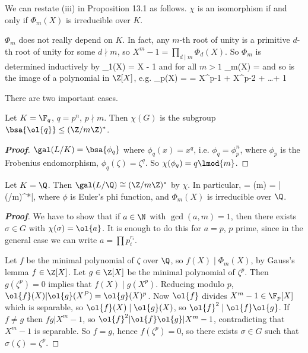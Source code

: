 We can restate (iii) in Proposition 13.1 as follows. $\chi$ is an isomorphism if and only if $\Phi_m(X)$ is irreducible over $K$.

$\Phi_m$ does not really depend on $K$. In fact, any $m$-th root of unity is a primitive $d$-th root of unity for some $d \nmid m$, so $X^m - 1 = \prod_{d\mid m} \Phi_d(X)$. So $\Phi_m$ is determined inductively by
\be
\Phi_1(X) = X - 1
\ee
and for all $m > 1$
\be
\Phi_m(X) =  
\ee
and so is the image of a polynomial in $\Z[X]$, e.g.
\be
\Phi_p(X) =  = X^{p-1} + X^{p-2} + \dots+ 1
\ee

There are two important cases.

\begin{proposition}
Let $K = \F_q$, $q = p^n$, $p \nmid m$. Then $\chi(G)$ is the subgroup $\bsa{\ol{q}} \leq  (\Z/m\Z)^*$.
\end{proposition}

\begin{proof}[\bf Proof]
$\gal(L/K) = \bsa{\phi_q}$ where $\phi_q(x) = x^q$, i.e. $\phi_q = \phi^n_p$, where $\phi_p$ is the Frobenius endomorphism, $\phi_q(\zeta ) = \zeta^q$. So $\chi(\phi_q) = q \lmod{m}$.
\end{proof}

\begin{theorem}
Let $K = \Q$. Then $\gal(L/\Q) \cong (\Z/m\Z)^*$ by $\chi$. In particular,
\be
[\Q(\zeta ) : \Q] = \phi(m) = |(\Z/m\Z)^*|,
\ee
where $\phi$ is Euler's phi function, and $\Phi_m(X)$ is irreducible over $\Q$.
\end{theorem}

\begin{proof}[\bf Proof]
We have to show that if $a \in \N$ with $\gcd(a,m) = 1$, then there exists $\sigma \in G$ with $\chi(\sigma) = \ol{a}$. It is enough to do this for $a = p$, $p$ prime, since in the general case we can write $a = \prod p^{r_i}_i$.

Let $f$ be the minimal polynomial of $\zeta$ over $\Q$, so $f(X) \mid \Phi_m(X)$, by Gauss's lemma $f \in \Z[X]$. Let $g\in\Z[X]$ be the minimal polynomial of $\zeta^p$. Then $g(\zeta^p) = 0$ implies that $f(X) \mid g(X^p)$. Reducing modulo $p$, $\ol{f}(X) | \ol{g}(X^P ) = \ol{g}(X)^p$. Now $\ol{f}$ divides
$X^m - 1 \in \F_p[X]$ which is separable, so $\ol{f}(X) \mid \ol{g}(X)$, so $\ol{f}^2 \mid \ol{f} \ol{g}$. If $f \neq g$ then $fg | X^m - 1$, so $\ol{f}^2 | \ol{f} \ol{g} | X^m - 1$, contradicting that $X^m - 1$ is separable. So $f = g$, hence $f(\zeta^p) = 0$, so there exists $\sigma \in G$ such that $\sigma(\zeta ) = \zeta^p$.
\end{proof}

